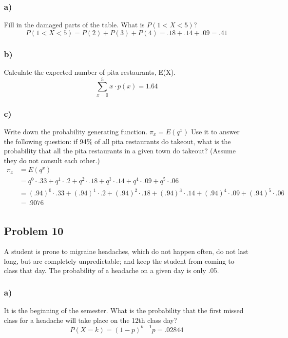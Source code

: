 \documentclass{article}
\begin{document}
\subsubsection*{a)}
Fill in the damaged parts of the table. What is $P(1<X<5)$?
\begin{equation}
    P(1<X<5) = P(2)+P(3)+P(4) = .18 + .14 + .09 = .41
\end{equation}
\subsubsection*{b)}
Calculate the expected number of pita restaurants, E(X). 
\begin{equation}
    \sum^5_{x=0} x\cdot p(x) = 1.64
\end{equation}
\subsubsection*{c)}
Write down the probability generating function. $\pi_x = E(q^x)$ Use it to answer the following question: if 94\% of all pita restaurants do takeout, what is the probability that all the pita restaurants in a given town do takeout? (Assume they do not consult each other.)
\begin{align}
    \pi_x &= E(q^x)\\
    &= q^0\cdot.33+q^1\cdot.2+q^2\cdot.18+q^3\cdot.14+q^4\cdot.09+q^5\cdot.06\\
    &= (.94)^0\cdot.33+(.94)^1\cdot.2+(.94)^2\cdot.18+(.94)^3\cdot.14+(.94)^4\cdot.09+(.94)^5\cdot.06\\
    &= .9076\\ 
\end{align}
\subsection*{Problem 10}
A student is prone to migraine headaches, which do not happen often, do not last long, but are completely unpredictable; and keep the student from coming to class that day. The probability of a headache on a given day is only .05.
\subsubsection*{a)}
It is the beginning of the semester. What is the probability that the first missed class for a headache will take place on the 12th class day?
\begin{equation}
    P(X = k) = (1-p)^{k-1}p = .02844
\end{equation}
\end{document}
